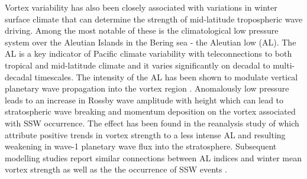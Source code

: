 Vortex variability has also been closely associated with variations in winter surface climate that can determine the strength of mid-latitude tropospheric wave driving. Among the most notable of these is the climatological low pressure system over the Aleutian Islands in the Bering sea - the Aleutian low (AL). The AL is a key indicator of Pacific climate variability with teleconnections to both tropical and mid-latitude climate \citep{Nitta1989, Trenberth1994, Zhang1997} and it varies significantly on decadal to multi-decadal timescales. The intensity of the AL has been shown to modulate vertical planetary wave propagation into the vortex region \citep{wooConnection2015b, garfinkelTropospheric2010b, manziniInfluence2006b}. Anomalously low pressure leads to an increase in Rossby wave amplitude with height \citep{plumb} which can lead to stratospheric wave breaking and momentum deposition on the vortex associated with SSW occurrence. The effect has been found in the reanalysis study of \cite{huDecadal2018b} which attribute positive trends in vortex strength to a less intense AL and resulting weakening in wave-1 planetary wave flux into the stratosphere. Subsequent modelling studies report similar connections between AL indices and winter mean vortex strength as well as the the occurrence of SSW events \citep{krenWintertime2016b}. 

